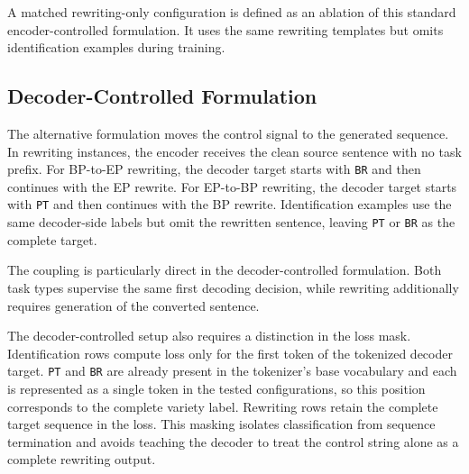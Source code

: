 A matched rewriting-only configuration is defined as an ablation of this
standard encoder-controlled formulation. It uses the same rewriting templates
but omits identification examples during training.

\subsection{Decoder-Controlled Formulation}
\label{sec:method-decoder-label}

The alternative formulation moves the control signal to the generated
sequence. In rewriting instances, the encoder receives the clean source
sentence with no task prefix. For BP-to-EP rewriting, the decoder target starts
with \texttt{BR} and then continues with the EP rewrite. For EP-to-BP
rewriting, the decoder target starts with \texttt{PT} and then continues with
the BP rewrite. Identification examples use the same decoder-side labels but
omit the rewritten sentence, leaving \texttt{PT} or \texttt{BR} as the complete
target.

The coupling is particularly direct in the decoder-controlled formulation.
Both task types supervise the same first decoding decision, while rewriting
additionally requires generation of the converted sentence.

The decoder-controlled setup also requires a distinction in the loss mask.
Identification rows compute loss only for the first token of the tokenized
decoder target. \texttt{PT} and \texttt{BR} are already present in the
tokenizer's base vocabulary and each is represented as a single token in the
tested configurations, so this position corresponds to the complete variety
label. Rewriting rows retain the complete target sequence in the loss.
This masking isolates classification from sequence termination
and avoids teaching the decoder to treat the control string alone as a complete
rewriting output.

